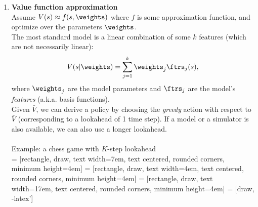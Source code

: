 \begin{enumerate}
\item \textbf{Value function approximation}\\
Assume $V(s)\approx f(s,\weights)$ where $f$ is some approximation function, and optimize over the parameters $\weights$.\\
The most standard model is a linear combination of some $k$ features (which are not necessarily linear):
$$\bar{V}(s|\weights) = \sum_{j=1}^k \weights_j \ftrs_j(s),$$
where $\weights_j$ are the model parameters and $\ftrs_j$ are the model's \emph{features} (a.k.a. basis functions).\\
Given $\bar{V}$, we can derive a policy by choosing the \emph{greedy} action with respect to $\bar{V}$ (corresponding to a lookahead of 1 time step). If a model or a simulator is also available, we can also use a longer lookahead.\\
\\
Example: a chess game with $K$-step lookahead\\
 = [rectangle, draw,
    text width=7em, text centered, rounded corners, minimum height=4em]
 = [rectangle, draw,
    text width=4em, text centered, rounded corners, minimum height=4em]
 = [rectangle, draw,
    text width=17em, text centered, rounded corners, minimum height=4em]
 = [draw, -latex']


\end{enumerate}
